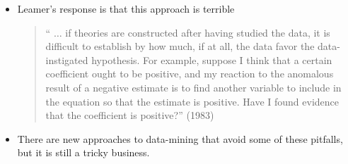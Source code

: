 \documentclass[12pt]{article}
\begin{document}
\begin{itemize}
\item Leamer's response is that this approach is terrible
\begin{quote}
`` $\dots$ if theories are constructed after having studied the data, it is difficult to establish by how much, if at all, the data favor the data-instigated hypothesis.  For example, suppose I think that a certain coefficient ought to be positive, and my reaction to the anomalous result of a negative estimate is to find another variable to include in the equation so that the estimate is positive.  Have I found evidence that the coefficient is positive?'' (1983)
\end{quote}

\item There are new approaches to data-mining that avoid some of these pitfalls, but it is still a tricky business.
\end{itemize}
\end{document}
